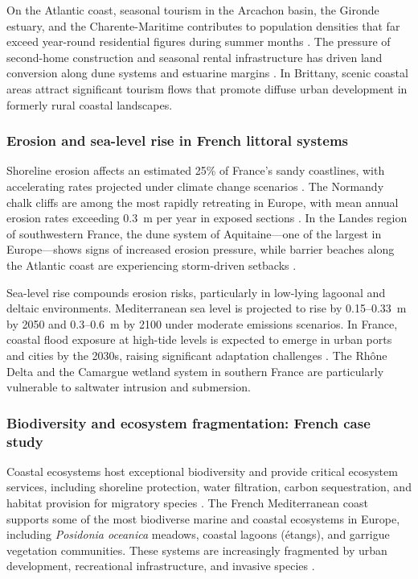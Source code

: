 \documentclass[coasts,article,submit,pdftex,moreauthors]{Definitions/mdpi}
\begin{document}
On the Atlantic coast, seasonal tourism in the Arcachon basin, the Gironde estuary, and the Charente-Maritime contributes to population densities that far exceed year-round residential figures during summer months \citep{blondy2016residences,observatoire2024charente}. The pressure of second-home construction and seasonal rental infrastructure has driven land conversion along dune systems and estuarine margins \citep{paskoff1988touristic,blondy2018secondhomes}. In Brittany, scenic coastal areas attract significant tourism flows that promote diffuse urban development in formerly rural coastal landscapes.

\subsubsection{Erosion and sea-level rise in French littoral systems}

Shoreline erosion affects an estimated 25\% of France's sandy coastlines, with accelerating rates projected under climate change scenarios \citep{euroion2004,meur-ferec2011}. The Normandy chalk cliffs are among the most rapidly retreating in Europe, with mean annual erosion rates exceeding 0.3~m per year in exposed sections \citep{costa2004falaises}. In the Landes region of southwestern France, the dune system of Aquitaine—one of the largest in Europe—shows signs of increased erosion pressure, while barrier beaches along the Atlantic coast are experiencing storm-driven setbacks \citep{castelle2018aquitaine,chaumillon2017storms}.

Sea-level rise compounds erosion risks, particularly in low-lying lagoonal and deltaic environments. Mediterranean sea level is projected to rise by 0.15–0.33~m by 2050 and 0.3–0.6~m by 2100 under moderate emissions scenarios. In France, coastal flood exposure at high-tide levels is expected to emerge in urban ports and cities by the 2030s, raising significant adaptation challenges \citep{LeCozannet2024}. The Rhône Delta and the Camargue wetland system in southern France are particularly vulnerable to saltwater intrusion and submersion.

\subsubsection{Biodiversity and ecosystem fragmentation: French case study}

Coastal ecosystems host exceptional biodiversity and provide critical ecosystem services, including shoreline protection, water filtration, carbon sequestration, and habitat provision for migratory species \citep{Sanchez2015}. The French Mediterranean coast supports some of the most biodiverse marine and coastal ecosystems in Europe, including \textit{Posidonia oceanica} meadows, coastal lagoons (étangs), and garrigue vegetation communities. These systems are increasingly fragmented by urban development, recreational infrastructure, and invasive species \citep{IPCC2022med}.
\end{document}
